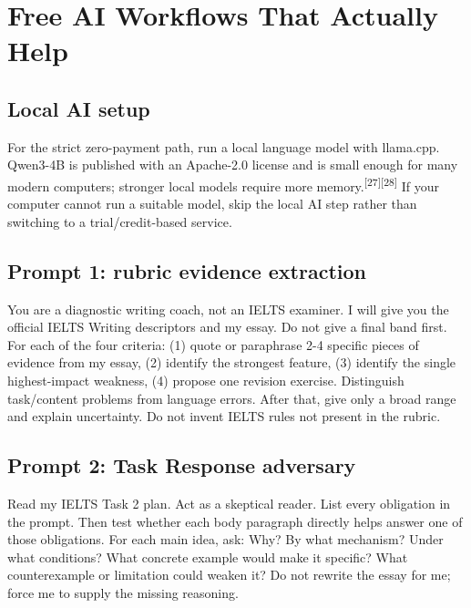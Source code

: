 \documentclass[11pt,a4paper]{article}
\newcommand{\src}[1]{\textsuperscript{[#1]}}
\begin{document}
\section{Free AI Workflows That Actually Help}

\subsection{Local AI setup}
For the strict zero-payment path, run a local language model with llama.cpp. Qwen3-4B is published with an Apache-2.0 license and is small enough for many modern computers; stronger local models require more memory.\src{27}\src{28} If your computer cannot run a suitable model, skip the local AI step rather than switching to a trial/credit-based service.

\subsection{Prompt 1: rubric evidence extraction}
\begin{aibox}
\small
You are a diagnostic writing coach, not an IELTS examiner. I will give you the official IELTS Writing descriptors and my essay. Do not give a final band first. For each of the four criteria: (1) quote or paraphrase 2-4 specific pieces of evidence from my essay, (2) identify the strongest feature, (3) identify the single highest-impact weakness, (4) propose one revision exercise. Distinguish task/content problems from language errors. After that, give only a broad range and explain uncertainty. Do not invent IELTS rules not present in the rubric.
\end{aibox}

\subsection{Prompt 2: Task Response adversary}
\begin{aibox}
\small
Read my IELTS Task 2 plan. Act as a skeptical reader. List every obligation in the prompt. Then test whether each body paragraph directly helps answer one of those obligations. For each main idea, ask: Why? By what mechanism? Under what conditions? What concrete example would make it specific? What counterexample or limitation could weaken it? Do not rewrite the essay for me; force me to supply the missing reasoning.
\end{aibox}
\end{document}
